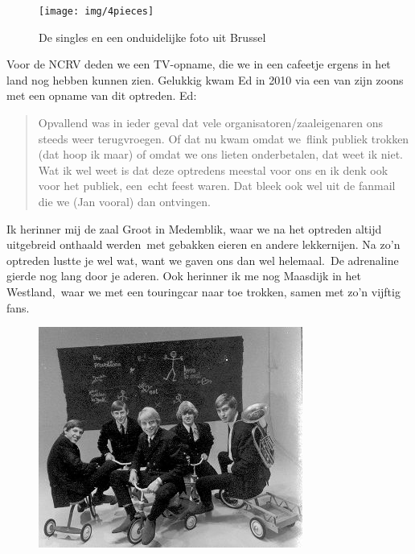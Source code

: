 \documentclass[10pt,twoside, openright]{memoir}
\begin{document}
\begin{figure}
\texttt{[image: img/4pieces]}
\caption*{\footnotesize De singles en een onduidelijke foto uit Brussel}
\end{figure}

Voor de NCRV deden we een TV-opname, die we in een cafeetje ergens in het land nog hebben kunnen zien. Gelukkig kwam Ed in 2010 via een van zijn zoons met een opname van dit optreden. Ed: 

\begin{quote}
Opvallend was in ieder geval dat vele organisatoren/zaaleigenaren ons steeds weer terugvroegen. Of dat nu kwam omdat we flink publiek trokken (dat hoop ik maar) of omdat we ons lieten onderbetalen, dat weet ik niet. Wat ik wel weet is dat deze optredens meestal voor ons en ik denk ook voor het publiek, een echt feest waren. Dat bleek ook wel uit de fanmail die we (Jan vooral) dan ontvingen.
\end{quote}

Ik herinner mij de zaal Groot in Medemblik, waar we na het optreden altijd uitgebreid onthaald werden met gebakken eieren en andere lekkernijen. Na zo'n optreden lustte je wel wat, want we gaven ons dan wel helemaal. De adrenaline gierde nog lang door je aderen. Ook herinner ik me nog Maasdijk in het Westland, waar we met een touringcar naar toe trokken, samen met zo'n vijftig fans. 

\begin{figure}
\includegraphics[width=\textwidth]{img/156-13 - Hartland3.jpg}
\end{figure}
\end{document}
